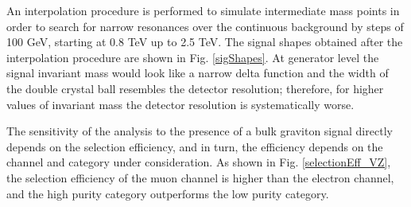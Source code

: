 An interpolation procedure is performed to simulate intermediate mass points in order to search for narrow resonances over the continuous background by steps of 100 GeV, starting at 0.8 TeV up to 2.5 TeV. The signal shapes obtained after the interpolation procedure are shown in Fig. \ref{sigShapes}. At generator level the signal invariant mass would look like a narrow delta function and the width of the double crystal ball resembles the detector resolution; therefore, for higher values of invariant mass the detector resolution is systematically worse. 

The sensitivity of the analysis to the presence of a bulk graviton signal directly depends on the selection efficiency, and in turn, the efficiency depends on the channel and category under consideration. As shown in Fig. \ref{selectionEff_VZ}, the selection efficiency of the muon channel is higher than the electron channel, and the high purity category outperforms the low purity category. 

